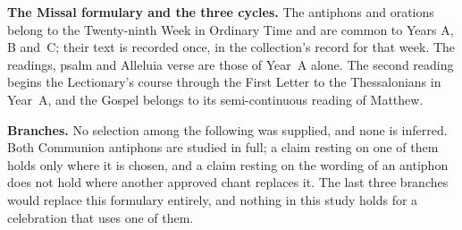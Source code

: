 {\textbf{The Missal formulary and the three cycles.} The antiphons and orations
belong to the Twenty-ninth Week in Ordinary Time and are common to Years A, B
and~C; their text is recorded once, in the collection's record for that week.
The readings, psalm and Alleluia verse are those of Year~A alone. The second
reading begins the Lectionary's course through the First Letter to the
Thessalonians in Year~A, and the Gospel belongs to its semi-continuous reading
of Matthew.

\textbf{Branches.} No selection among the following was supplied, and none is
inferred. Both Communion antiphons are studied in full; a claim resting on one
of them holds only where it is chosen, and a claim resting on the wording of an
antiphon does not hold where another approved chant replaces it. The last three
branches would replace this formulary entirely, and nothing in this study holds
for a celebration that uses one of them.
\par}


